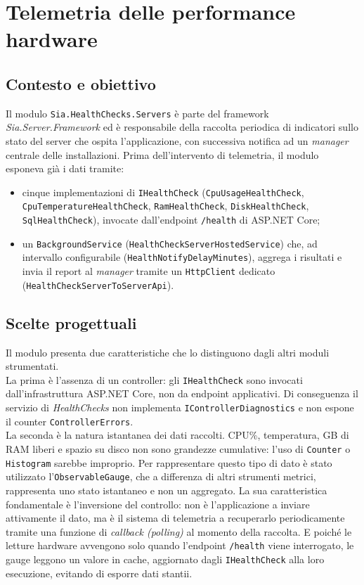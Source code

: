 \section{Telemetria delle performance hardware}

\subsection{Contesto e obiettivo}

Il modulo \texttt{Sia.HealthChecks.Servers} è parte del framework \emph{Sia.Server.Framework}
ed è responsabile della raccolta periodica di indicatori sullo stato del server che ospita
l'applicazione, con successiva notifica ad un \emph{manager} centrale delle installazioni.
Prima dell'intervento di telemetria, il modulo esponeva già i dati tramite:
\begin{itemize}
      \item cinque implementazioni di \texttt{IHealthCheck} (\texttt{CpuUsageHealthCheck},\\
            \texttt{CpuTemperatureHealthCheck}, \texttt{RamHealthCheck}, \texttt{DiskHealthCheck},
            \texttt{SqlHealthCheck}), invocate dall'endpoint \texttt{/health} di ASP.NET Core;
      \item un \texttt{BackgroundService} (\texttt{HealthCheckServerHostedService}) che, ad
            intervallo configurabile (\texttt{HealthNotifyDelayMinutes}), aggrega i risultati e
            invia il report al \emph{manager} tramite un \texttt{HttpClient} dedicato
            (\texttt{HealthCheckServerToServerApi}).
\end{itemize}

\subsection{Scelte progettuali}

Il modulo presenta due caratteristiche che lo distinguono dagli altri moduli strumentati.\\
La prima è l'assenza di un controller: gli \texttt{IHealthCheck} sono invocati
dall'infrastruttura ASP.NET Core, non da endpoint applicativi. Di conseguenza
il servizio di \emph{HealthChecks} non implementa \texttt{IControllerDiagnostics}
e non espone il counter \texttt{ControllerErrors}.\\
La seconda è la natura istantanea dei dati raccolti. CPU\%, temperatura, GB di
RAM liberi e spazio su disco non sono grandezze cumulative: l'uso di \texttt{Counter} o
\texttt{Histogram} sarebbe improprio. Per rappresentare questo tipo di dato è stato utilizzato l'\texttt{ObservableGauge},
che a differenza di altri strumenti metrici, rappresenta uno stato istantaneo e non un aggregato.
La sua caratteristica fondamentale
è l'inversione del controllo: non è l'applicazione a inviare attivamente il dato, ma è il sistema
di telemetria a recuperarlo periodicamente tramite una funzione di \emph{callback (polling)} al momento della raccolta.
E poiché le letture hardware avvengono solo quando l'endpoint \texttt{/health} viene
interrogato, le gauge leggono un valore in cache, aggiornato dagli
\texttt{IHealthCheck} alla loro esecuzione, evitando di esporre dati stantii.

